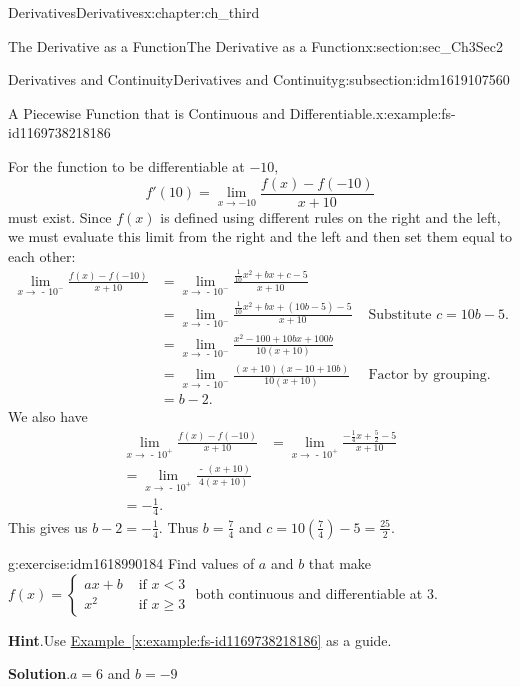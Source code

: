 \documentclass[oneside,10pt,]{book}
\newcommand{\blocktitlefont}{\relax}
\newcommand{\xreffont}{\relax}
\numberwithin{equation}{section}
\newcommand{\lt}{<}
\newcommand{\amp}{&}
\begin{document}
\begin{chapterptx}{Derivatives}{}{Derivatives}{}{}{x:chapter:ch_third}
\begin{sectionptx}{The Derivative as a Function}{}{The Derivative as a Function}{}{}{x:section:sec_Ch3Sec2}
\begin{subsectionptx}{Derivatives and Continuity}{}{Derivatives and Continuity}{}{}{g:subsection:idm1619107560}
\begin{example}{A Piecewise Function that is Continuous and Differentiable.}{x:example:fs-id1169738218186}
\par
For the function to be differentiable at \(-10,\)%
%
\begin{equation*}
f'(10)=\lim_{x\to -10}\frac{f(x)-f(-10)}{x+10}
\end{equation*}
must exist. Since \(f(x)\) is defined using different rules on the right and the left, we must evaluate this limit from the right and the left and then set them equal to each other:%
%
\begin{align*}
\lim_{x\to \text{ - }10^-}\frac{f(x)-f(-10)}{x+10}\amp=\lim_{x\to \text{ - }10^-}\frac{\frac{1}{10}x^2+bx+c-5}{x+10}\\
\amp=\lim_{x\to \text{ - }10^-}\frac{\frac{1}{10}x^2+bx+(10b-5)-5}{x+10}\amp\text{ Substitute } c=10b-5.\\
\amp=\lim_{x\to \text{ - }10^-}\frac{x^2-100+10bx+100b}{10(x+10)}\\
\amp=\lim_{x\to \text{ - }10^-}\frac{(x+10)(x-10+10b)}{10(x+10)}\amp\text{ Factor by grouping. }\\
\amp=b-2.
\end{align*}
We also have%
%
\begin{align*}
\lim_{x\to \text{ - }10^+}\frac{f(x)-f(-10)}{x+10}\amp=\lim_{x\to \text{ - }10^+}\frac{-\frac{1}{4}x+\frac{5}{2}-5}{x+10}\\
=\lim_{x\to \text{ - }10^+}\frac{\text{ - }(x+10)}{4(x+10)}\\
=-\frac{1}{4}.
\end{align*}
This gives us \(b-2=-\frac{1}{4}.\) Thus \(b=\frac{7}{4}\) and \(c=10(\frac{7}{4})-5=\frac{25}{2}.\)%
\end{example}
\begin{inlineexercise}{}{g:exercise:idm1618990184}%
Find values of \(a\) and \(b\) that make \(f(x)=\begin{cases} ax+b  \amp \text{ if } x\lt 3 \\ x^2  \amp \text{ if } x\geq 3 \end{cases} \) both continuous and differentiable at \(3.\)%
\par\smallskip%
\noindent\textbf{\blocktitlefont Hint}.\hypertarget{g:hint:idm1618990312}{}\quad{}Use \hyperref[x:example:fs-id1169738218186]{Example~{\xreffont\ref{x:example:fs-id1169738218186}}} as a guide.%
\par\smallskip%
\noindent\textbf{\blocktitlefont Solution}.\hypertarget{g:solution:idm1618989416}{}\quad{}\(a=6\) and \(b=-9\)%
\end{inlineexercise}%
\end{subsectionptx}

\end{sectionptx}
\end{chapterptx}
\end{document}
